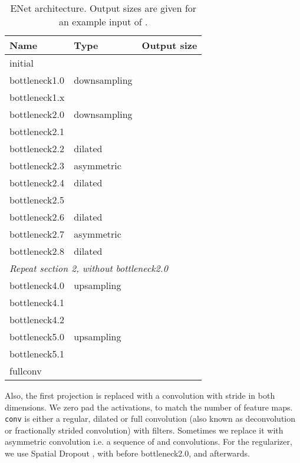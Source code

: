 \documentclass{article}
\begin{document}
\begin{wraptable}{r}{2.75in}
  \footnotesize
  \caption{ENet architecture. Output sizes are given for an example input of .}
  \vspace{0.05in}
  \label{tab:structure}
  \centering
  \begin{tabular}{@{}l >{\centering}m{0.7in} c @{}}
    \toprule
    Name                & Type & Output size                  \\
    \midrule
    initial             &                   &    \\
    \midrule
    bottleneck1.0       &  downsampling     &    \\
     bottleneck1.x  &                   &    \\
    \midrule
    bottleneck2.0       &  downsampling     &     \\
    bottleneck2.1       &                   &     \\
    bottleneck2.2       &  dilated       &     \\
    bottleneck2.3       &  asymmetric    &     \\
    bottleneck2.4       &  dilated       &     \\
    bottleneck2.5       &                   &     \\
    bottleneck2.6       &  dilated       &     \\
    bottleneck2.7       &  asymmetric    &     \\
    bottleneck2.8       &  dilated      &     \\
    \midrule
    \multicolumn{3}{l}{\textit{Repeat section 2, without bottleneck2.0}} \\
    \midrule
    bottleneck4.0       &  upsampling       &     \\
    bottleneck4.1       &                   &     \\
    bottleneck4.2       &                   &     \\
    \midrule
    bottleneck5.0       &  upsampling       &     \\
    bottleneck5.1       &                   &     \\
    \midrule
    fullconv            &                   &     \\
    \bottomrule
  \end{tabular}
  \vspace{-0.2in}
\end{wraptable}
Also, the first  projection is replaced with a  convolution with stride  in both dimensions.
We zero pad the activations, to match the number of feature maps.
\texttt{conv} is either a regular, dilated or full convolution (also known as deconvolution or fractionally strided convolution) with  filters. Sometimes we replace it with asymmetric convolution i.e. a sequence of  and  convolutions.
For the regularizer, we use Spatial Dropout \cite{tompson15}, with  before bottleneck2.0, and  afterwards.
\end{document}
